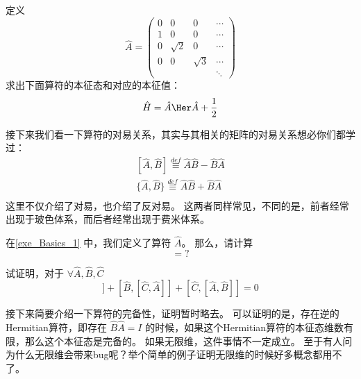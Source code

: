\begin{exercise}{}\label{exe_Basics_1}
定义
\begin{equation}
\hat{A} = \left(
\begin{matrix}
0 & 0 & 0 & \cdots \\
1 & 0 & 0 & \cdots \\
0 & \sqrt{2} & 0 & \cdots\\
0 & 0 & \sqrt{3} & \cdots\\
  &  &  &  \ddots
\end{matrix}
\right)
\end{equation}
求出下面算符的本征态和对应的本征值：
\begin{equation}
\hat{H} = \hat{A}\Her\hat{A} + \frac{1}{2}
\end{equation}
\end{exercise}

接下来我们看一下算符的对易关系，其实与其相关的矩阵的对易关系想必你们都学过：
\begin{equation}
\begin{split}
[\hat{A},\hat{B}] \overset{def}{\equiv}\hat{A}\hat{B} - \hat{B}\hat{A}\\
\{\hat{A},\hat{B}\} \overset{def}{\equiv}\hat{A}\hat{B} + \hat{B}\hat{A}\\
\end{split}
\end{equation}
这里不仅介绍了对易，也介绍了反对易。 这两者同样常见，不同的是，前者经常出现于玻色体系，而后者经常出现于费米体系。

\begin{exercise}{}
在\autoref{exe_Basics_1} 中，我们定义了算符 $\hat{A}$。 那么，请计算
\begin{equation}
[\hat{A},\hat{A}\Her] = ?
\end{equation}
\end{exercise}

\begin{exercise}{}
试证明，对于 $\forall \hat{A}, \hat{B}, \hat{C}$
\begin{equation}
[\hat{A},[\hat{B},\hat{C}]] + [\hat{B},[\hat{C},\hat{A}]] + [\hat{C},[\hat{A},\hat{B}]] = 0
\end{equation}
\end{exercise}

接下来简要介绍一下算符的完备性，证明暂时略去。 可以证明的是，存在逆的Hermitian算符，即存在 $\hat{B}\hat{A} = I$ 的时候，如果这个Hermitian算符的本征态维数有限，那么这个本征态是完备的。 如果无限维，这件事情不一定成立。 至于有人问为什么无限维会带来bug呢？举个简单的例子证明无限维的时候好多概念都用不了。

